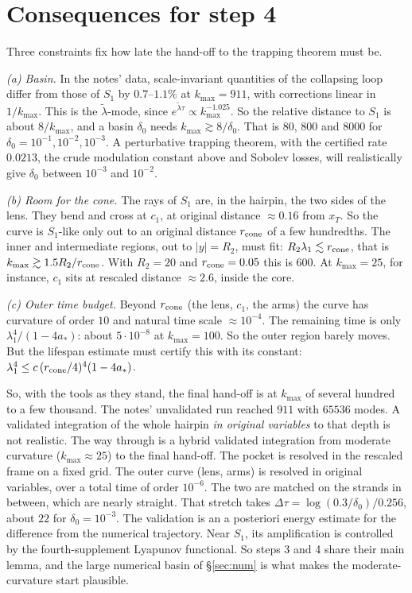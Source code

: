 \documentclass[11pt]{amsart}
\theoremstyle{remark}
\begin{document}
\section{Consequences for step 4}\label{sec:step4}

Three constraints fix how late the hand-off to the trapping theorem must be.

\emph{(a) Basin.} In the notes' data, scale-invariant quantities of the collapsing loop differ from those of $S_1$ by $0.7$--$1.1\%$ at $k_{\max}=911$, with corrections linear in $1/k_{\max}$. This is the $\tilde\lambda$-mode, since $e^{\tilde\lambda\tau}\propto k_{\max}^{-1.025}$. So the relative distance to $S_1$ is about $8/k_{\max}$, and a basin $\delta_0$ needs $k_{\max}\gtrsim8/\delta_0$. That is $80$, $800$ and $8000$ for $\delta_0=10^{-1},10^{-2},10^{-3}$. A perturbative trapping theorem, with the certified rate $0.0213$, the crude modulation constant above and Sobolev losses, will realistically give $\delta_0$ between $10^{-3}$ and $10^{-2}$.

\emph{(b) Room for the cone.} The rays of $S_1$ are, in the hairpin, the two sides of the lens. They bend and cross at $c_1$, at original distance $\approx0.16$ from $x_T$. So the curve is $S_1$-like only out to an original distance $r_{\rm cone}$ of a few hundredths. The inner and intermediate regions, out to $|y|=R_2$, must fit: $R_2\lambda_1\lesssim r_{\rm cone}$, that is $k_{\max}\gtrsim1.5R_2/r_{\rm cone}$. With $R_2=20$ and $r_{\rm cone}=0.05$ this is $600$. At $k_{\max}=25$, for instance, $c_1$ sits at rescaled distance $\approx2.6$, inside the core.

\emph{(c) Outer time budget.} Beyond $r_{\rm cone}$ (the lens, $c_1$, the arms) the curve has curvature of order $10$ and natural time scale $\approx10^{-4}$. The remaining time is only $\lambda_1^4/(1-4a_*)$: about $5\cdot10^{-8}$ at $k_{\max}=100$. So the outer region barely moves. But the lifespan estimate must certify this with its constant: $\lambda_1^4\le c\,(r_{\rm cone}/4)^4(1-4a_*)$.

So, with the tools as they stand, the final hand-off is at $k_{\max}$ of several hundred to a few thousand. The notes' unvalidated run reached $911$ with $65536$ modes. A validated integration of the whole hairpin \emph{in original variables} to that depth is not realistic. The way through is a hybrid validated integration from moderate curvature ($k_{\max}\approx25$) to the final hand-off. The pocket is resolved in the rescaled frame on a fixed grid. The outer curve (lens, arms) is resolved in original variables, over a total time of order $10^{-6}$. The two are matched on the strands in between, which are nearly straight. That stretch takes $\Delta\tau=\log(0.3/\delta_0)/0.256$, about $22$ for $\delta_0=10^{-3}$. The validation is an a posteriori energy estimate for the difference from the numerical trajectory. Near $S_1$, its amplification is controlled by the fourth-supplement Lyapunov functional. So steps 3 and 4 share their main lemma, and the large numerical basin of \S\ref{sec:num} is what makes the moderate-curvature start plausible.
\end{document}
